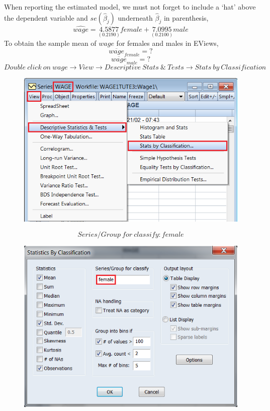\documentclass[12pt]{report}
\begin{document}
\vspace{-\baselineskip}
\noindent When reporting the estimated model, we must not forget to include a `hat' above the dependent variable and $se(\hat{\beta}_j)$ underneath $\hat{\beta}_j$ in parenthesis,
$$\widehat{wage} = \underset{(0.2190)}{4.5877}female + \underset{(0.2100)}{7.0995}male$$
\noindent To obtain the sample mean of $wage$ for females and males in EViews,
$$\overline{wage}_{female} = ?$$
$$\overline{wage}_{male} = ?$$
$$Double\ click\ on\ wage \to View \to Descriptive\ Stats\ \&\ Tests \to Stats\ by\ Classification$$
\begin{figure}[H]
	\centering
	\includegraphics{q2_6}
\end{figure}
\vspace{-\baselineskip}
$$Series/Group\ for\ classify: female$$
\begin{figure}[H]
	\centering
	\includegraphics{q2_7}
\end{figure}
\end{document}
